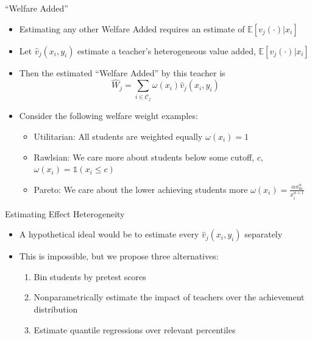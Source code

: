 \documentclass[t,aspectratio=169,11pt]{beamer}
\begin{document}
\begin{frame}{``Welfare Added''}

\begin{itemize}
    \item Estimating any other Welfare Added requires an estimate of $\mathbb{E}[v_j(\cdot)|x_i]$
    \item Let $\hat{v}_j(x_i,y_i)$ estimate a teacher's heterogeneous value added, $\mathbb{E}[v_j(\cdot)|x_i]$
    
    \item Then the estimated ``Welfare Added'' by this teacher is  
    \[
    \hat{W}_j  = \sum_{i\in \mathcal{C}_j} \omega(x_i) \hat{v}_j(x_i,y_i) 
    \] 
    
    \item Consider the following welfare weight examples:
    \begin{itemize}
        \item Utilitarian: All students are weighted equally $\omega(x_i) = 1$
        \item Rawlsian: We care more about students below some cutoff, $c$, $\omega(x_i) = \mathds{1}(x_i\leq c)$
        \item Pareto: We care about the lower achieving students more $ \omega(x_i)=  \frac{\alpha x_\mathrm{m}^\alpha}{x_i^{\alpha+1}}$ 
    \end{itemize}
    
\end{itemize}


\end{frame}


\begin{frame}{Estimating Effect Heterogeneity}

\begin{itemize}
    \item A hypothetical ideal would be to estimate every $\hat{v}_j(x_i,y_i)$ separately
    \item This is impossible, but we propose three alternatives:
    \begin{enumerate}
        \item Bin students by pretest scores
        \item Nonparametrically estimate the impact of teachers over the achievement distribution
        \item Estimate quantile regressions over relevant percentiles
    \end{enumerate}

\end{itemize}

\end{frame}
\end{document}
